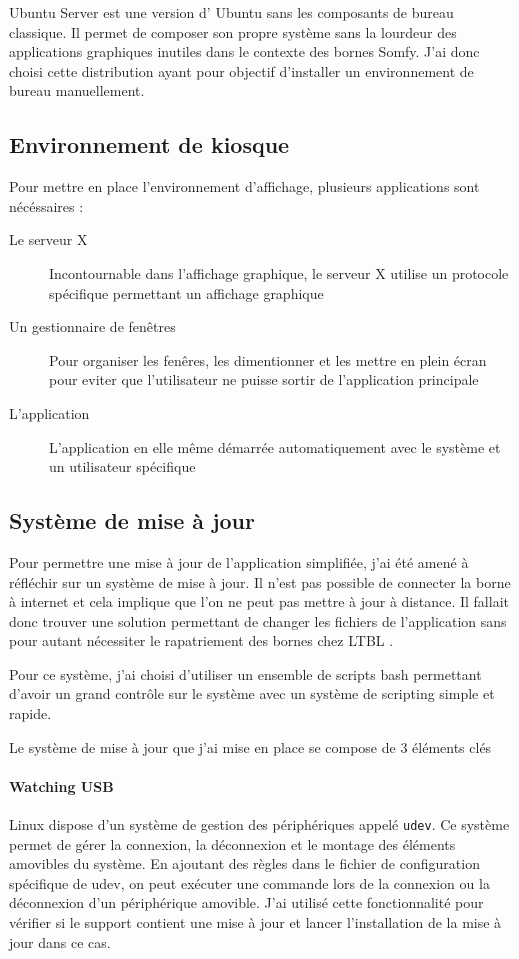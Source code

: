 Ubuntu Server est une version d’ Ubuntu sans les composants de bureau classique.
Il permet de composer son propre système sans la lourdeur des applications graphiques inutiles dans le contexte des bornes Somfy.
J'ai donc choisi cette distribution ayant pour objectif d'installer un environnement de bureau manuellement.

\subsection{Environnement de kiosque}

Pour mettre en place l'environnement d'affichage, plusieurs applications sont nécéssaires :

\begin{description}
    \item[Le serveur X] Incontournable dans l'affichage graphique, le serveur X utilise un protocole spécifique permettant un affichage graphique
    \item[Un gestionnaire de fenêtres] Pour organiser les fenêres, les dimentionner et les mettre en plein écran pour eviter que l'utilisateur ne puisse sortir de l'application principale
    \item[L'application] L'application en elle même démarrée automatiquement avec le système et un utilisateur spécifique
\end{description}

\subsection{Système de mise à jour}

Pour permettre une mise à jour de l'application simplifiée, j'ai été amené à réfléchir sur un système de mise à jour.
Il n'est pas possible de connecter la borne à internet et cela implique que l'on ne peut pas mettre à jour à distance.
Il fallait donc trouver une solution permettant de changer les fichiers de l'application sans pour autant nécessiter le rapatriement des bornes chez LTBL .

Pour ce système, j'ai choisi d'utiliser un ensemble de scripts bash permettant d'avoir un grand contrôle sur le système avec un système de scripting simple et rapide.

Le système de mise à jour que j'ai mise en place se compose de 3 éléments clés

\paragraph{Watching USB} Linux dispose d'un système de gestion des périphériques appelé \texttt{udev}.
Ce système permet de gérer la connexion, la déconnexion et le montage des éléments amovibles du système.
En ajoutant des règles dans le fichier de configuration spécifique de udev, on peut exécuter une commande lors de la connexion ou la déconnexion d'un périphérique amovible.
J'ai utilisé cette fonctionnalité pour vérifier si le support contient une mise à jour et lancer l'installation de la mise à jour dans ce cas.

